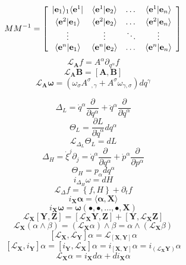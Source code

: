 \documentclass[10pt]{article}
\begin{document}
\[
  M M^{-1} = \left[ \begin{array}{cccc}
                 | {\mathbf e}_1 \rangle_1 \langle {\mathbf e}^1 | & \langle {\mathbf e}^1 | {\mathbf e}_2 \rangle & \dots & \langle {\mathbf e}^1 | {\mathbf e}_n \rangle \vspace{1mm}\\
                 \langle {\mathbf e}^2 | {\mathbf e}_1 \rangle & \langle {\mathbf e}^2 | {\mathbf e}_2 \rangle & \dots & \langle {\mathbf e}^2 | {\mathbf e}_n \rangle \\
	    	     \vdots                   &     \vdots                 & \ddots &   \vdots \\
                 \langle {\mathbf e}^n | {\mathbf e}_1 \rangle & \langle {\mathbf e}^n | {\mathbf e}_2 \rangle & \dots & \langle {\mathbf e}^n | {\mathbf e}_n \rangle \\
			   \end{array}
			   \right]
\]
\[
  {\mathcal L}_{\mathbf A} f = A^{\alpha} \partial_{q^{\alpha}} f
\]
\[
  {\mathcal L}_{\mathbf A} {\mathbf B} = [{\mathbf A},{\mathbf B}]
\]
\[
  {\mathcal L}_{\mathbf A} {\mathbf \omega} = ( \omega_{\sigma} {A^{\sigma}}_{,\gamma} + A^{\sigma} \omega_{\gamma,\sigma} ) d q^{\gamma}
\]

\null
\[
  \Delta_L = {\dot q}^{\alpha} \frac{\partial}{\partial q^{\alpha}} + {\ddot q}^{\alpha} \frac{\partial}{\partial {\dot q}^{\alpha}}
\]
\[
  \Theta_L = \frac{\partial L}{\partial {\dot q}^{\alpha}} d q^{\alpha}
\]
\[
  {\mathcal L}_{\Delta_L} \Theta_L = d L
\]
\[
  \Delta_H = {\dot \xi}^{j} \partial_j = {\dot q}^{\alpha} \frac{\partial}{\partial {q^{\alpha}}} + {\dot p}^{\alpha} \frac{\partial}{\partial {p^{\alpha}}}
\]
\[
  \Theta_H = p_{\alpha} d q^{\alpha}
\]
\[
  i_{\Delta_H} \omega = d H
\]
\[
 {\mathcal L}_{\Delta} f = \left\{ f , H \right\} + \partial_t f
\]
\[
  i_{\mathbf X} {\mathbf \alpha} = \langle {\mathbf \alpha} , {\mathbf X} \rangle
\]
\[
  i_{\mathbf X} {\mathbf \omega} = {\mathbf \omega} \left( \bullet , \bullet, \dots, \bullet, {\mathbf X} \right)
\]
\[
   {\mathcal L}_{\mathbf X} \left[ {\mathbf Y}, {\mathbf Z} \right] 
 = \left[ {\mathcal L}_{\mathbf X} {\mathbf Y}, {\mathbf Z} \right] + \left[ {\mathbf Y}, {\mathcal L}_{\mathbf X} {\mathbf Z} \right]
\]
\[
  {\mathcal L}_{\mathbf X} \left( \alpha \wedge \beta \right) 
 = \left( {\mathcal L}_{\mathbf X} \alpha \right) \wedge \beta
 = \alpha \wedge \left( {\mathcal L}_{\mathbf X} \beta \right) 
\]
\[
  \left[ {\mathcal L}_{\mathbf X}, {\mathcal L}_{\mathbf Y} \right] \alpha = {\mathcal L}_{\left[ {\mathbf X}, {\mathbf Y} \right] } \alpha
\]
\[
    \left[ {\mathcal L}_{\mathbf X} , i_{\mathbf Y} \right] \alpha 
  = \left[ i_{\mathbf Y}, {\mathcal L}_{\mathbf X} \right] \alpha 
  = i_{\left[ {\mathbf X}, {\mathbf Y} \right] } \alpha
  = i_{ \left( {\mathcal L}_{\mathbf X} {\mathbf Y} \right) } \alpha
\]
\[
 {\mathcal L}_{\mathbf X} \alpha = i_{\mathbf X} d \alpha + d i_{\mathbf X} \alpha
\]
\end{document}
